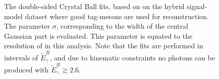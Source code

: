 \begin{figure}[htbp!]
{    }

    \caption{\label{fig:resolution_fits} The double-sided Crystal Ball fits, based on 
    on the hybrid signal-model dataset where good tag-\B mesons are used for \EB reconstruction.
    The parameter $\sigma$, corresponding to the width of the central Gaussian part is evaluated.
    This parameter is equated to the resolution of \EB in this analysis.
    Note that the fits are performed in intervals of $\tilde{E}_{\gamma}^B$, and due to kinematic constraints
    no \BtoXsgamma photons can be produced with $\tilde{E}_{\gamma}^B\gtrsim 2.6$.
    }
\end{figure}

